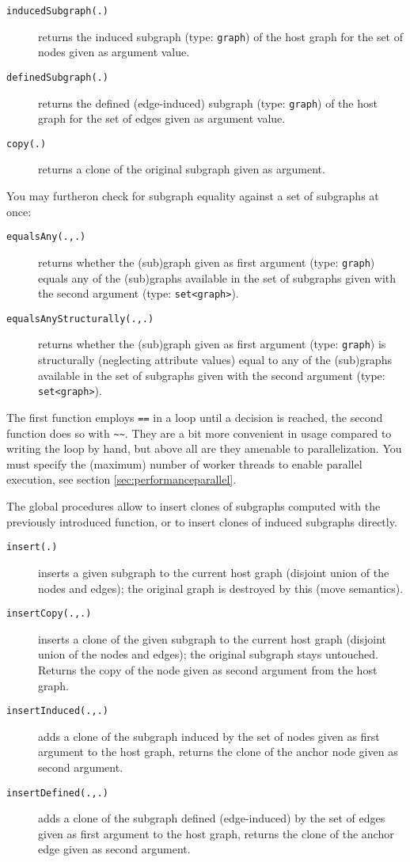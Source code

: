 \begin{description}
\item[\texttt{inducedSubgraph(.)}] returns the induced subgraph (type: \texttt{graph}) of the host graph for the set of nodes given as argument value.
\item[\texttt{definedSubgraph(.)}] returns the defined (edge-induced) subgraph (type: \texttt{graph}) of the host graph for the set of edges given as argument value.
\item[\texttt{copy(.)}] returns a clone of the original subgraph given as argument.
\end{description}

You may furtheron check for subgraph equality against a set of subgraphs at once:

\begin{description}
\item[\texttt{equalsAny(.,.)}] returns whether the (sub)graph given as first argument (type: \texttt{graph}) equals any of the (sub)graphs available in the set of subgraphs given with the second argument (type: \texttt{set<graph>}).
\item[\texttt{equalsAnyStructurally(.,.)}] returns whether the (sub)graph given as first argument (type: \texttt{graph}) is structurally (neglecting attribute values) equal to any of the (sub)graphs available in the set of subgraphs given with the second argument (type: \texttt{set<graph>}).
\end{description}

The first function employs \verb#==# in a loop until a decision is reached, the second function does so with \verb#~~#.
They are a bit more convenient in usage compared to writing the loop by hand, but above all are they amenable to parallelization.
You must specify the (maximum) number of worker threads to enable parallel execution, see section \ref{sec:performanceparallel}.
 
The global procedures allow to insert clones of subgraphs computed with the previously introduced function,
or to insert clones of induced subgraphs directly.

\begin{description}
\item[\texttt{insert(.)}] inserts a given subgraph to the current host graph (disjoint union of the nodes and edges); the original graph is destroyed by this (move semantics).
\item[\texttt{insertCopy(.,.)}] inserts a clone of the given subgraph to the current host graph (disjoint union of the nodes and edges); the original subgraph stays untouched. Returns the copy of the node given as second argument from the host graph.
\item[\texttt{insertInduced(.,.)}] adds a clone of the subgraph induced by the set of nodes given as first argument to the host graph, returns the clone of the anchor node given as second argument.
\item[\texttt{insertDefined(.,.)}] adds a clone of the subgraph defined (edge-induced) by the set of edges given as first argument to the host graph, returns the clone of the anchor edge given as second argument.
\end{description}

